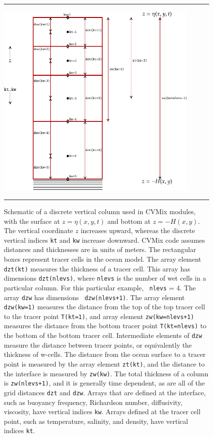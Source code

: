 \begin{figure}[h!t]
\rule{\textwidth}{0.005in}
\begin{center}
\includegraphics[angle=0,width=10cm]{./mfpic_figs/cvmix_discrete_vertical.pdf}
\caption[Discrete vertical column for CVMix modules]{\sf Schematic of
  a discrete vertical column used in CVMix modules, with the surface
  at $z=\eta(x,y,t)$ and bottom at $z=-H(x,y)$.  The vertical
  coordinate $z$ increases upward, whereas the discrete vertical
  indices {\tt kt} and {\tt kw} increase downward.  CVMix code assumes
  distances and thicknesses are in units of meters. The rectangular
  boxes represent tracer cells in the ocean model.  The array element
  {\tt dzt(kt)} measures the thickness of a tracer cell. This array
  has dimensions {\tt dzt(nlevs)}, where {\tt nlevs} is the number of
  wet cells in a particular column.  For this particular example, {\tt
    nlevs} = 4.  The array {\tt dzw} has dimensions {\tt
    dzw(nlevs+1)}.  The array element {\tt dzw(kw=1)} measures the
  distance from the top of the top tracer cell to the tracer point
  {\tt T(kt=1)}, and array element {\tt zw(kw=nlevs+1)} measures the
  distance from the bottom tracer point {\tt T(kt=nlevs)} to the bottom
  of the bottom tracer cell.  Intermediate elements of {\tt dzw}
  measure the distance between tracer points, or equivalently the
  thickness of w-cells.  The distance from the ocean surface to a
  tracer point is measured by the array element {\tt zt(kt)}, and the
  distance to the interface is measured by {\tt zw(kw)}.  The total
  thickness of a column is {\tt zw(nlevs+1)}, and it is generally time
  dependent, as are all of the grid distances {\tt dzt} and {\tt dzw}.
  Arrays that are defined at the interface, such as buoyancy
  frequency, Richardson number, diffusivity, viscosity, have vertical
  indices {\tt kw}.  Arrays defined at the tracer cell point, such as
  temperature, salinity, and density, have vertical indices {\tt kt}.}
\label{fig:cvmix_discrete_vertical}
\end{center}
\rule{\textwidth}{0.005in}
\end{figure}


